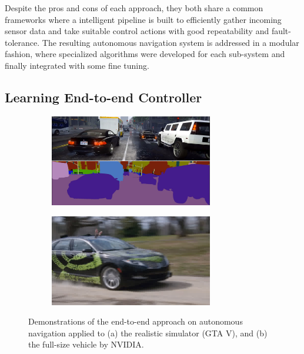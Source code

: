 \documentclass[../thesis.tex]{subfiles}
\begin{document}

Despite the pros and cons of each approach, they both share a common frameworks where a intelligent pipeline is built to efficiently gather incoming sensor data and take suitable control actions with good repeatability and fault-tolerance. 
The resulting autonomous navigation system is addressed in a modular fashion, where specialized algorithms were developed for each sub-system and finally integrated with some fine tuning.


\subsection{Learning End-to-end Controller}

\begin{figure}[b]
    \centering
    \begin{subfigure}[b]{0.45\linewidth}
        \includegraphics[height=4cm]{./Introduction/fig/gta.jpg}
    \end{subfigure}
    \begin{subfigure}[b]{0.45\linewidth}
        \includegraphics[height=4cm]{./Introduction/fig/nvidia.jpg}
    \end{subfigure}
    \caption{Demonstrations of the end-to-end approach on autonomous navigation applied to (a) the realistic simulator (GTA V), and (b) the full-size vehicle by NVIDIA\cite{nvidiacar}.}
    \label{fig:end-to-end}
\end{figure}

\end{document}
